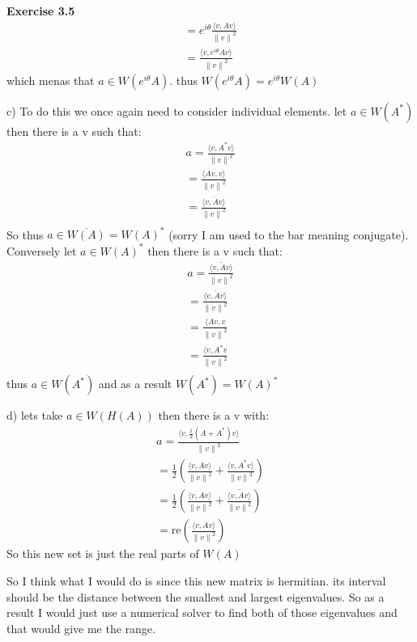 \documentclass[12pt]{article}
\newenvironment{exercise}[1]{\vspace{.1in}\noindent\textbf{Exercise #1 \hspace{.05em}}}{}
\newcommand{\norm}[1]{\left\lVert#1\right\rVert}
\theoremstyle{definition}
\theoremstyle{remark}
\begin{document}
\begin{exercise}{3.5}
	\begin{align}
		=e^{i\theta}\frac{\langle v, Av\rangle}{\norm{v}^2} \\
		=\frac{\langle v, e^{i\theta}Av\rangle}{\norm{v}^2}
	\end{align} which menas that $a\in W(e^{i\theta}A)$. thus $W(e^{i\theta}A)=e^{i\theta}W(A)$

	c) To do this we once again need to consider individual elements. let $a\in W(A^*)$ then there is a v such that:
	\begin{align}
		a=\frac{\langle v, A^*v\rangle}{\norm{v}^2}         \\
		=\frac{\langle Av, v\rangle}{\norm{v}^2}            \\
		=\frac{\overline{\langle v, Av\rangle}}{\norm{v}^2} \\
	\end{align}
	So thus $a\in \overline{W(A)}=W(A)^*$ (sorry I am used to the bar meaning conjugate). Conversely let $a\in W(A)^*$ then there is a v such that:
	\begin{align}
		a=\overline{\frac{\langle v, Av\rangle}{\norm{v}^2}} \\
		=\frac{\overline{\langle v, Av\rangle}}{\norm{v}^2}  \\
		=\frac{\langle Av, v}{\norm{v}^2}                    \\
		=\frac{\langle v, A^*v}{\norm{v}^2}                  \\
	\end{align}
	thus $a\in W(A^*)$ and as a result $W(A^*)=W(A)^*$

	d) lets take $a\in W(H(A))$ then there is a v with:
	\begin{align}
		a=\frac{\langle v, \frac{1}{2}(A+A^*)v\rangle}{\norm{v}^2}                                             \\
		=\frac{1}{2}(\frac{\langle v,Av\rangle}{\norm{v}^2}+\frac{\langle v,A^*v\rangle}{\norm{v}^2})          \\
		=\frac{1}{2}(\frac{\langle v,Av\rangle}{\norm{v}^2}+\overline{\frac{\langle v,Av\rangle}{\norm{v}^2}}) \\
		=\text{re}(\frac{\langle v,Av\rangle}{\norm{v}^2})
	\end{align}
	So this new set is just the real parts of $W(A)$

	So I think what I would do is since this new matrix is hermitian. its interval should be the distance between the smallest and largest eigenvalues. So as a result I would just use a numerical solver to find both of those eigenvalues and that would give me the range.

\end{exercise}
\end{document}

